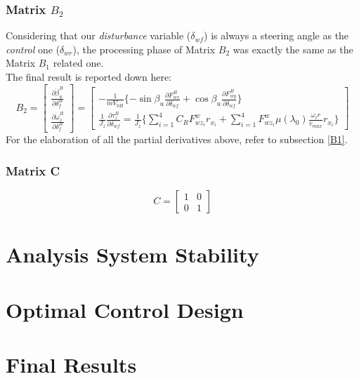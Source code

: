 \documentclass[a4paper,12pt,titlepage]{report}
\begin{document}
	\subsection{Matrix $B_{2}$}
	Considering that our \textit{disturbance} variable ($\delta_{wf}$) is always a steering angle as the \textit{control} one ($\delta_{wr}$), the processing phase of Matrix $B_{2}$ was exactly the same as the Matrix $B_{1}$ related one. \\ The final result is reported down here:
		\begin{equation}
			B_{2}=
			\begin{bmatrix}
			\frac{\partial\dot{\beta}_{u}^{B}}{\partial\delta_{f}^{B}} \\
			\frac{\partial\dot{\omega}_{z}^{B}}{\partial\delta_{f}^{B}} 
			\end{bmatrix} =
			\begin{bmatrix}
			 -\frac{1}{mV_{0B}}\{-\sin\beta_{u}\frac{\partial F_{wx}^{B}}{\partial \delta_{wf}} + \cos\beta_{u}\frac{\partial F_{wy}^{B}}{\partial \delta_{wf}}\} \\
		\frac{1}{J_{z}} \frac{\partial \tau_{z}^{B}}{\partial\delta_{wf}} = \frac{1}{J_{z}} \{ \sum\limits_{i=1}^4 C_{R}F_{wz_{i}}^{w} r_{x_{i}} + \sum\limits_{i=1}^4 F_{wz_{i}}^{w} \mu(\lambda_{0}) \frac{\omega_{i} r}{v_{max}}r_{x_{i}} \}
			\end{bmatrix}
		\end{equation}
	For the elaboration of all the partial derivatives above, refer to subsection \ref{B1}.
	\subsection{Matrix C}
		\begin{equation}
		C = 
		\begin{bmatrix}
		1 & 0\\
		0 & 1
		\end{bmatrix}
		\end{equation}
	

	
\chapter{Analysis System Stability}
\chapter{Optimal Control Design}
\chapter{Final Results}
\end{document}
